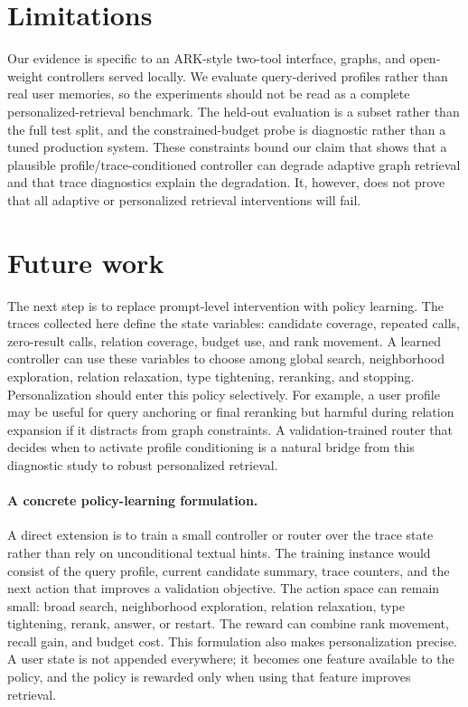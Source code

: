 \section{Limitations}
Our evidence is specific to an ARK-style two-tool interface, \stark graphs, and open-weight \qwen controllers served locally. We evaluate query-derived profiles rather than real user memories, so the experiments should not be read as a complete personalized-retrieval benchmark. The held-out evaluation is a subset rather than the full test split, and the constrained-budget probe is diagnostic rather than a tuned production system. These constraints bound our claim that \tb shows that a plausible profile/trace-conditioned controller can degrade adaptive graph retrieval and that trace diagnostics explain the degradation. It, however, does not prove that all adaptive or personalized retrieval interventions will fail.

\section{Future work}
The next step is to replace prompt-level intervention with policy learning. The traces collected here define the state variables: candidate coverage, repeated calls, zero-result calls, relation coverage, budget use, and rank movement. A learned controller can use these variables to choose among global search, neighborhood exploration, relation relaxation, type tightening, reranking, and stopping. Personalization should enter this policy selectively. For example, a user profile may be useful for query anchoring or final reranking but harmful during relation expansion if it distracts from graph constraints. A validation-trained router that decides when to activate profile conditioning is a natural bridge from this diagnostic study to robust personalized retrieval.

\paragraph{A concrete policy-learning formulation.}
A direct extension is to train a small controller or router over the trace state rather than rely on unconditional textual hints. The training instance would consist of the query profile, current candidate summary, trace counters, and the next action that improves a validation objective. The action space can remain small: broad search, neighborhood exploration, relation relaxation, type tightening, rerank, answer, or restart. The reward can combine rank movement, recall gain, and budget cost. This formulation also makes personalization precise. A user state is not appended everywhere; it becomes one feature available to the policy, and the policy is rewarded only when using that feature improves retrieval.

